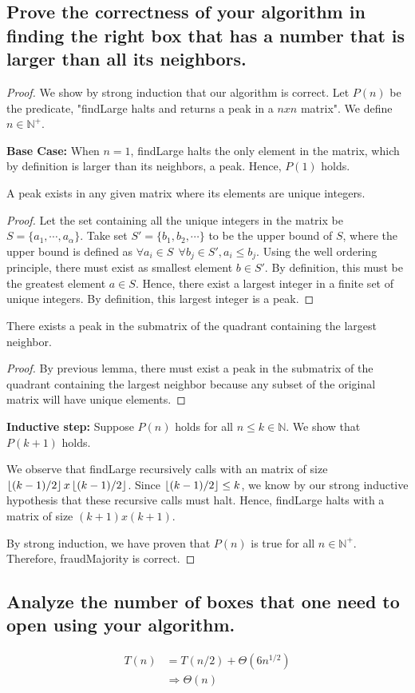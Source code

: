 \documentclass[11pt]{scrartcl}
\begin{document}
\subsection{
	Prove the correctness of your algorithm in finding the right box that has a number
	that is larger than all its neighbors.
}
\begin{proof}
	We show by strong induction that our algorithm is correct. Let $P(n)$ be the predicate,
	"findLarge halts and returns a peak in a $nxn$ matrix".
	We define $n \in \mathbb{N^{+}}$.
	\par \textbf{Base Case:} When $n = 1$, findLarge halts the only element in the matrix, which by definition
	is larger than its neighbors, a peak. Hence, $P(1)$ holds.
	\begin{theorem*}
		A peak exists in any given matrix where its elements are unique integers. 
		\begin{proof}
			Let the set 
			containing all the unique integers in the matrix be $S = \{a_1, \cdots, a_\alpha\}$. 	
			Take set $S' = \{b_1, b_2, \cdots\}$ to be the upper bound of $S$, 
			where the upper bound is defined as $ \forall a_i \in S \ \ \forall b_j \in S', a_i \leq b_j$.
			Using the well ordering principle, there must exist as smallest element $b \in S'$.
			By definition, this must be the greatest element $a \in S$. 
			Hence, there exist a largest integer in a finite set of unique integers. 
			By definition, this largest integer is a peak. 	
		\end{proof}
	\end{theorem*}
	\begin{corollary*}
		There exists a peak in the submatrix of the quadrant containing the largest neighbor.
		\begin{proof}
			By previous lemma, there must exist a peak in the submatrix of the quadrant containing the largest neighbor
			because any subset of the original matrix will have unique elements.
		\end{proof}
	\end{corollary*}	
	\par \textbf{Inductive step:} Suppose $P(n)$ holds for all $n \leq k \in \mathbb{N}$. We show that $P(k+1)$ holds.
	
	\par We observe that findLarge recursively calls with an matrix of size 
	$\left\lfloor (k-1) / 2 \right\rfloor x \left\lfloor (k-1) / 2 \right\rfloor$.
	Since $\left\lfloor (k-1) / 2 \right\rfloor \leq k$, we know by our strong inductive hypothesis that these
	recursive calls must halt. Hence, findLarge halts with a matrix of size $(k+1)x(k+1)$.


	\par By strong induction, we have proven that $P(n)$ is true for all $n \in \mathbb{N^{+}}$.
	Therefore, fraudMajority is correct.
\end{proof}

\subsection{
	Analyze the number of boxes that one need to open using your algorithm.
}
\begin{align*}
	T(n)   & = T(n/2) + \Theta(6n^{1/2})\\
	& \Rightarrow \Theta(n)
\end{align*}
\end{document}
